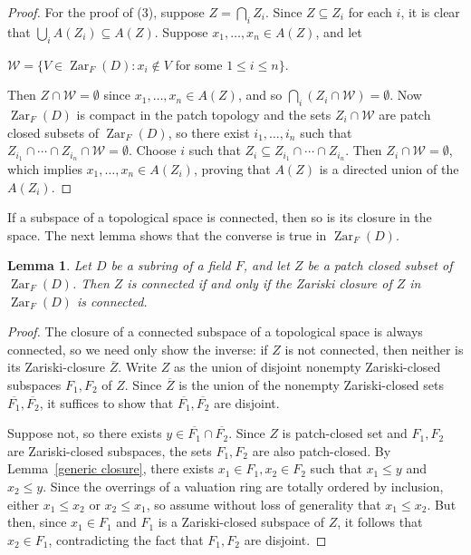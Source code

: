 \documentclass[preprint, 11pt,nonatbib]{elsarticle}
\DeclareMathOperator{\Zar}{Zar}
\newtheorem{lemma}[theorem]{Lemma}
\theoremstyle{definition}
\numberwithin{theorem}{section}
\begin{document}
\begin{proof}
For the proof of (3),  suppose $Z = \bigcap_i Z_i.$
 Since $Z \subseteq Z_i$ for each $i$, it is clear that $\bigcup_{i}A(Z_i)
\subseteq  A(Z)$. Suppose $x_1,\ldots,x_n \in A(Z)$, and let 
\begin{center}
${\mathcal{W}} = \{V \in \Zar_F(D):x_i \not \in V$ for some $1 \leq i \leq n\}$. 
\end{center}
Then $Z \cap {\mathcal{W}} = \emptyset$ since $x_1,\ldots,x_n \in A(Z)$, and so $\bigcap_{i} (Z_i \cap {\mathcal{W}}) = \emptyset$. 
Now $\Zar_F(D)$ is compact in the patch topology and  
the sets $Z_i \cap {\mathcal{W}}$ are patch closed subsets of  $\Zar_F(D)$, so there exist $i_1,\ldots,i_n$ such that $ Z_{i_1} \cap \cdots \cap Z_{i_n} \cap {\mathcal{W}} =\emptyset$. Choose $i$ such that  $Z_i \subseteq Z_{i_1} \cap \cdots \cap Z_{i_n}$. Then $Z_i \cap {\mathcal{W}} = \emptyset$, which implies $x_1,\ldots,x_n \in A(Z_i)$, proving that   $A(Z)$ is a directed union of the $A(Z_i).$
\end{proof}

If a  subspace  of a topological space  is connected, then so is its closure in the space. The next lemma shows that the converse is true in $\Zar_F(D)$. 

 
\begin{lemma} \label{dense} Let $D$ be a subring of a field $F$, and let $Z$ be a patch closed subset of $\Zar_F(D)$. Then $Z$ is connected if and only if the Zariski closure of $Z$ in $\Zar_F(D)$ is connected. 
%
\end{lemma}

\begin{proof}
The closure of a connected subspace of a topological space is always connected, so we need only show the inverse: if $Z$ is not connected, then neither is its Zariski-closure $\overline{Z}$.
Write $Z$ as the union of disjoint nonempty Zariski-closed subspaces $F_1, F_2$ of $Z$.
Since $\overline{Z}$ is the union of the nonempty Zariski-closed sets $\overline{F_1}, \overline{F_2}$, it suffices to show that $\overline{F_1}, \overline{F_2}$ are disjoint.

Suppose not, so there exists $y \in \overline{F_1} \cap \overline{F_2}$.
Since $Z$ is patch-closed set and $F_1, F_2$ are Zariski-closed subspaces, the sets $F_1, F_2$ are also patch-closed.
By Lemma~\ref{generic closure}, there exists $x_1 \in F_1, x_2 \in F_2$ such that $x_1 \le y$ and $x_2 \le y$.
Since the overrings of a valuation ring are totally ordered by inclusion, either $x_1 \le x_2$ or $x_2 \le x_1$, so assume without loss of generality that $x_1 \le x_2$.
But then, since $x_1 \in F_1$ and $F_1$ is a Zariski-closed subspace of $Z$, it follows that $x_2 \in F_1$, contradicting the fact that $F_1, F_2$ are disjoint.
\end{proof} 
\end{document}
